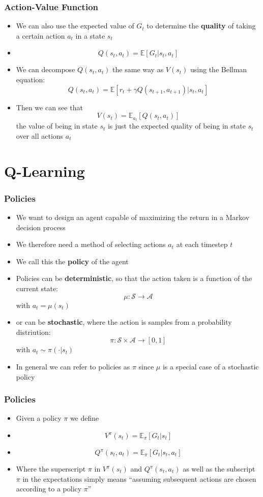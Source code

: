 \documentclass{beamer}
\begin{document}
\begin{frame}
  \frametitle{Action-Value Function}
  \begin{itemize}
    \item We can also use the expected value of $G_t$ to determine the \textbf{quality} of taking a certain action $a_t$ in a state $s_t$
    \item $$Q(s_t, a_t) = \mathbb{E} \left[ G_t \vert s_t, a_t \right]$$
    \item We can decompose $Q(s_t, a_t)$ the same way as $V(s_t)$ using the Bellman equation:
    $$Q(s_t, a_t) = \mathbb{E} \left[ r_t + \gamma Q(s_{t+1}, a_{t+1}) \vert s_t, a_t \right]$$
    \item Then we can see that $$V(s_t) = \mathbb{E}_{a_t} \left[ Q(s_t, a_t) \right]$$ the value of being in state $s_t$ is just the expected quality of being in state $s_t$ over all actions $a_t$
  \end{itemize}
\end{frame}

\section{Q-Learning}
\begin{frame}
  \frametitle{Policies}
  \begin{itemize}
    \item We want to design an agent capable of maximizing the return in a Markov decision process
    \item We therefore need a method of selecting actions $a_t$ at each timestep $t$
    \item We call this the \textbf{policy} of the agent
    \item Policies can be \textbf{deterministic}, so that the action taken is a function of the current state: $$\mu: \mathcal{S} \to \mathcal{A}$$ with $a_t = \mu(s_t)$
    \item or can be \textbf{stochastic}, where the action is samples from a probability distriution: $$\pi: \mathcal{S} \times \mathcal{A} \to \left[ 0, 1 \right]$$ with $a_t \sim \pi(\cdot \vert s_t)$
    \item In general we can refer to policies as $\pi$ since $\mu$ is a special case of a stochastic policy
  \end{itemize}
\end{frame}

\begin{frame}
  \frametitle{Policies}
  \begin{itemize}
    \item Given a policy $\pi$ we define
    \item $$V^\pi (s_t) = \mathbb{E}_\pi \left[ G_t \vert s_t \right]$$
    \item $$Q^\pi (s_t, a_t) = \mathbb{E}_\pi \left[ G_t \vert s_t, a_t \right]$$
    \item Where the superscript $\pi$ in $V^\pi(s_t)$ and $Q^\pi(s_t, a_t)$ as well as the subscript $\pi$ in the expectations simply means ``assuming subsequent actions are chosen according to a policy $\pi$''
  \end{itemize}
\end{frame}
\end{document}
